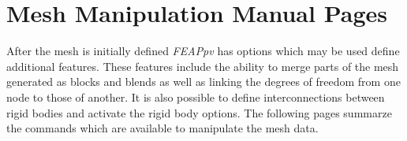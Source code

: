 \chapter[Mesh Manipulation Manual]{Mesh Manipulation Manual Pages}
\label{appxb}

After the mesh is initially defined
{\sl FEAPpv} has options which may be used define additional features.
These features include
the ability to merge parts of the mesh generated as blocks and blends
as well as linking the degrees of freedom from one node to those of
another.
It is also possible to define interconnections between rigid bodies and
activate the rigid body options.
The following
pages summarze the commands which are available to manipulate
the mesh data.

\pagebreak





